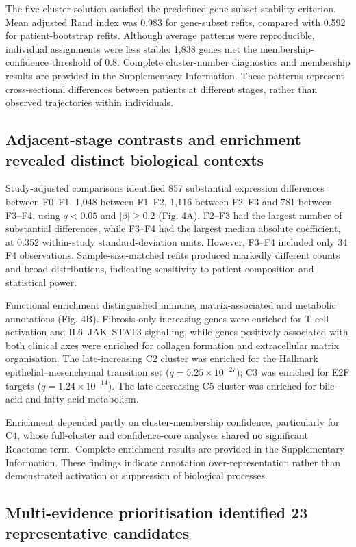 The five-cluster solution satisfied the predefined gene-subset stability criterion. Mean adjusted Rand index was 0.983 for gene-subset refits, compared with 0.592 for patient-bootstrap refits. Although average patterns were reproducible, individual assignments were less stable: 1,838 genes met the membership-confidence threshold of 0.8. Complete cluster-number diagnostics and membership results are provided in the Supplementary Information. These patterns represent cross-sectional differences between patients at different stages, rather than observed trajectories within individuals.

\subsection*{Adjacent-stage contrasts and enrichment revealed distinct biological contexts}

Study-adjusted comparisons identified 857 substantial expression differences between F0–F1, 1,048 between F1–F2, 1,116 between F2–F3 and 781 between F3–F4, using \(q<0.05\) and \(|\beta|\geq0.2\) (Fig. 4A). F2–F3 had the largest number of substantial differences, while F3–F4 had the largest median absolute coefficient, at 0.352 within-study standard-deviation units. However, F3–F4 included only 34 F4 observations. Sample-size-matched refits produced markedly different counts and broad distributions, indicating sensitivity to patient composition and statistical power.

Functional enrichment distinguished immune, matrix-associated and metabolic annotations (Fig. 4B). Fibrosis-only increasing genes were enriched for T-cell activation and IL6–JAK–STAT3 signalling, while genes positively associated with both clinical axes were enriched for collagen formation and extracellular matrix organisation. The late-increasing C2 cluster was enriched for the Hallmark epithelial–mesenchymal transition set (\(q=5.25\times10^{-27}\)); C3 was enriched for E2F targets (\(q=1.24\times10^{-14}\)). The late-decreasing C5 cluster was enriched for bile-acid and fatty-acid metabolism.

Enrichment depended partly on cluster-membership confidence, particularly for C4, whose full-cluster and confidence-core analyses shared no significant Reactome term. Complete enrichment results are provided in the Supplementary Information. These findings indicate annotation over-representation rather than demonstrated activation or suppression of biological processes.

\subsection*{Multi-evidence prioritisation identified 23 representative candidates}

